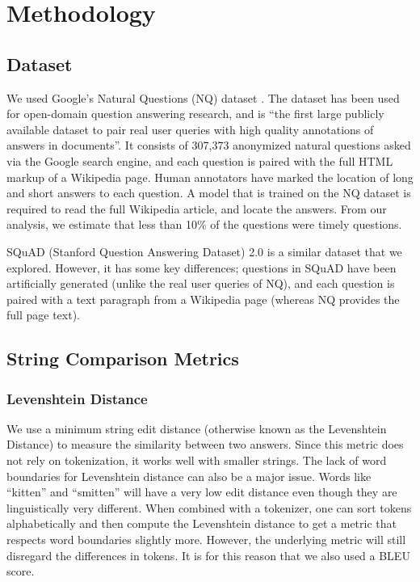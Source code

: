 \documentclass{article}
\begin{document}
\section{Methodology}
\label{methodology}


\subsection{Dataset}
\label{dataset}
We used Google’s Natural Questions (NQ) dataset \cite{nqdataset}. The dataset has been used for open-domain question answering research, and is “the first large publicly available dataset to pair real user queries with high quality annotations of answers in documents”. It consists of 307,373 anonymized natural questions asked via the Google search engine, and each question is paired with the full HTML markup of a Wikipedia page. Human annotators have marked the location of long and short answers to each question. A model that is trained on the NQ dataset is required to read the full Wikipedia article, and locate the answers. From our analysis, we estimate that less than 10\% of the questions were timely questions. 

SQuAD (Stanford Question Answering Dataset) 2.0 \cite{squaddataset} is a similar dataset that we explored. However, it has some key differences; questions in SQuAD have been artificially generated (unlike the real user queries of NQ), and each question is paired with a text paragraph from a Wikipedia page (whereas NQ provides the full page text).


\subsection{String Comparison Metrics}
\label{string methods}


\subsubsection{Levenshtein Distance}
\label{fuzzy}

We use a minimum string edit distance (otherwise known as the Levenshtein Distance) to measure the similarity between two answers. Since this metric does not rely on tokenization, it works well with smaller strings. The lack of word boundaries for Levenshtein distance can also be a major issue. Words like “kitten” and “smitten” will have  a very low edit distance even though they are linguistically very different. When combined with a tokenizer, one can sort tokens alphabetically and then compute the Levenshtein distance to get a metric that respects word boundaries slightly more. However, the underlying metric will still disregard the differences in tokens. It is for this reason that we also used a BLEU score.
\end{document}
